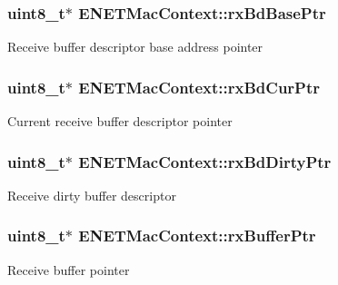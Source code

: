 \subsubsection[{\texorpdfstring{rx\+Bd\+Base\+Ptr}{rxBdBasePtr}}]{\setlength{\rightskip}{0pt plus 5cm}uint8\+\_\+t$\ast$ E\+N\+E\+T\+Mac\+Context\+::rx\+Bd\+Base\+Ptr}\hypertarget{structENETMacContext_a3da8d4131cc9deb3f08a078d27d7913c}{}\label{structENETMacContext_a3da8d4131cc9deb3f08a078d27d7913c}
Receive buffer descriptor base address pointer 
\subsubsection[{\texorpdfstring{rx\+Bd\+Cur\+Ptr}{rxBdCurPtr}}]{\setlength{\rightskip}{0pt plus 5cm}uint8\+\_\+t$\ast$ E\+N\+E\+T\+Mac\+Context\+::rx\+Bd\+Cur\+Ptr}\hypertarget{structENETMacContext_a7bcc90b2e020d340626ed190a275dabe}{}\label{structENETMacContext_a7bcc90b2e020d340626ed190a275dabe}
Current receive buffer descriptor pointer 
\subsubsection[{\texorpdfstring{rx\+Bd\+Dirty\+Ptr}{rxBdDirtyPtr}}]{\setlength{\rightskip}{0pt plus 5cm}uint8\+\_\+t$\ast$ E\+N\+E\+T\+Mac\+Context\+::rx\+Bd\+Dirty\+Ptr}\hypertarget{structENETMacContext_a710fe2c01d4b49dde272cee307a17ae5}{}\label{structENETMacContext_a710fe2c01d4b49dde272cee307a17ae5}
Receive dirty buffer descriptor 
\subsubsection[{\texorpdfstring{rx\+Buffer\+Ptr}{rxBufferPtr}}]{\setlength{\rightskip}{0pt plus 5cm}uint8\+\_\+t$\ast$ E\+N\+E\+T\+Mac\+Context\+::rx\+Buffer\+Ptr}\hypertarget{structENETMacContext_a06a24caa26fd7269f59ee182c951d687}{}\label{structENETMacContext_a06a24caa26fd7269f59ee182c951d687}
Receive buffer pointer 
